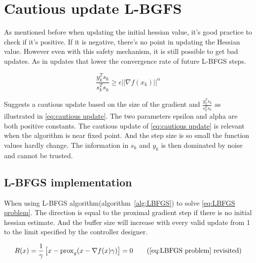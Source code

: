 	\section{Cautious update L-BGFS}
	As mentioned before when updating the initial hessian value, it's good practice to check if it's positive. If it is negative, there's no point in updating the Hessian value. However even with this safety mechanism, it is still possible to get bad updates. As in updates that lower the convergence rate of future L-BFGS steps.
	
	\begin{equation}
		\frac{y_k^Ts_k}{s_k^Ts_k} \ge \epsilon ||\nabla f(x_k)||^\alpha
		\label{eq:cautious update}
	\end{equation}
	
	\cite{Dong-HuiLi1999} Suggests a cautious update based on the size of the gradient and $\frac{y_k^Ts_k}{s_k^Ts_k}$ as illustrated in \eqref{eq:cautious update}. The two parameters epsilon and alpha are both positive constants. The cautious update of \eqref{eq:cautious update} is relevant when the algorithm is near fixed point. And the step size is so small the function values hardly change. The information in $s_k$ and $y_k$ is then dominated by noise and cannot be trusted.
	
	\subsection{L-BFGS implementation}
		When using  L-BFGS algorithm(algorithm~\ref{alg:LBFGS}) to solve \eqref{eq:LBFGS problem}. The direction is equal to the proximal gradient step if there is no initial hessian estimate. And the buffer size will increase with every valid update from 1 to the limit specified by the controller designer.
		
		\begin{equation}
			R(x) = \frac{1}{\gamma}\left[ x - \prox_g( x - \nabla f(x)\gamma) \right] = 0
			\tag{\eqref{eq:LBFGS problem} revisited}
		\end{equation}
		
